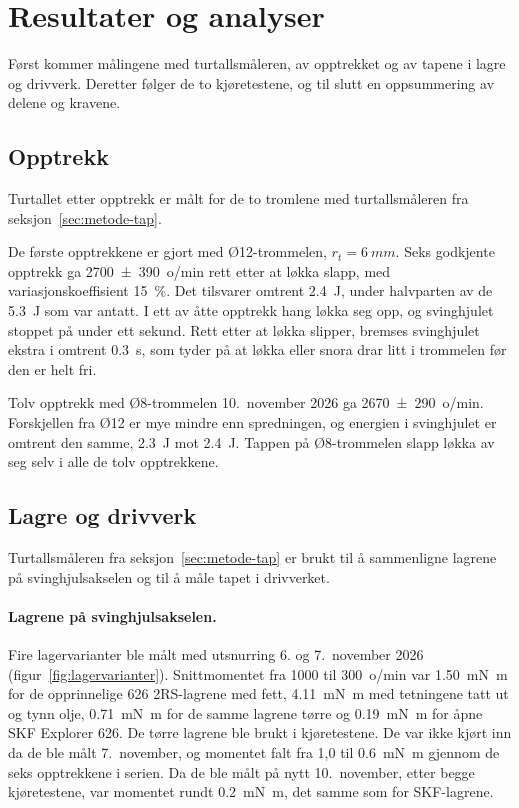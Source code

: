 \section{Resultater og analyser}
\label{sec:resultater}
Først kommer målingene med turtallsmåleren, av opptrekket og av tapene i lagre og drivverk. Deretter følger de to kjøretestene, og til slutt en oppsummering av delene og kravene.

\subsection{Opptrekk}
\label{sec:res-opptrekk}
Turtallet etter opptrekk er målt for de to tromlene med turtallsmåleren fra seksjon~\ref{sec:metode-tap}.

De første opptrekkene er gjort med Ø12-trommelen, $r_t = \SI{6}{mm}$.
Seks godkjente opptrekk ga \SI[separate-uncertainty=true]{2700 \pm 390}{o/min} rett etter at løkka slapp, med variasjonskoeffisient \SI{15}{\percent}. Det tilsvarer omtrent \SI{2,4}{J}, under halvparten av de \SI{5,3}{J} som var antatt. I ett av åtte opptrekk hang løkka seg opp, og svinghjulet stoppet på under ett sekund. Rett etter at løkka slipper, bremses svinghjulet ekstra i omtrent \SI{0,3}{s}, som tyder på at løkka eller snora drar litt i trommelen før den er helt fri.

Tolv opptrekk med Ø8-trommelen 10.~november 2026 ga \SI[separate-uncertainty=true]{2670 \pm 290}{o/min}. Forskjellen fra Ø12 er mye mindre enn spredningen, og energien i svinghjulet er omtrent den samme, \SI{2,3}{J} mot \SI{2,4}{J}. Tappen på Ø8-trommelen slapp løkka av seg selv i alle de tolv opptrekkene.

\subsection{Lagre og drivverk}
\label{sec:res-tapsledd}
\label{sec:res-utsnurring}
\label{sec:res-lager}
\label{sec:res-sim-lager}
Turtallsmåleren fra seksjon~\ref{sec:metode-tap} er brukt til å sammenligne lagrene på svinghjulsakselen og til å måle tapet i drivverket.

\paragraph{Lagrene på svinghjulsakselen.} Fire lagervarianter ble målt med utsnurring 6. og 7.~november 2026 (figur~\ref{fig:lagervarianter}). Snittmomentet fra 1000 til \SI{300}{o/min} var \SI{1,50}{mN.m} for de opprinnelige 626 2RS-lagrene med fett, \SI{4,11}{mN.m} med tetningene tatt ut og tynn olje, \SI{0,71}{mN.m} for de samme lagrene tørre og \SI{0,19}{mN.m} for åpne SKF Explorer 626. De tørre lagrene ble brukt i kjøretestene. De var ikke kjørt inn da de ble målt 7.~november, og momentet falt fra 1,0 til \SI{0,6}{mN.m} gjennom de seks opptrekkene i serien. Da de ble målt på nytt 10.~november, etter begge kjøretestene, var momentet rundt \SI{0,2}{mN.m}, det samme som for SKF-lagrene.

